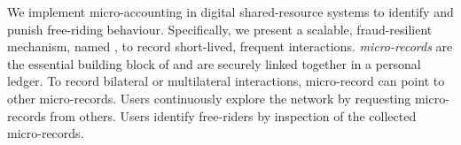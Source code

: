 
We implement micro-accounting in digital shared-resource systems to identify and punish free-riding behaviour.
Specifically, we present a scalable, fraud-resilient mechanism, named \ModelName{}, to record short-lived, frequent interactions.
\emph{micro-records} are the essential building block of \ModelName{} and are securely linked together in a personal ledger.
To record bilateral or multilateral interactions, micro-record can point to other micro-records.
Users continuously explore the network by requesting micro-records from others.
Users identify free-riders by inspection of the collected micro-records.


